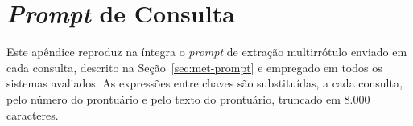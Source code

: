 \chapter{\texorpdfstring{\textit{Prompt}}{Prompt} de Consulta}\label{ap:prompt-consulta}

Este apêndice reproduz na íntegra o \textit{prompt} de extração multirrótulo enviado em cada consulta, descrito na Seção~\ref{sec:met-prompt} e empregado em todos os sistemas avaliados. As expressões entre chaves são substituídas, a cada consulta, pelo número do prontuário e pelo texto do prontuário, truncado em 8.000 caracteres.

\begin{small}
\end{small}
